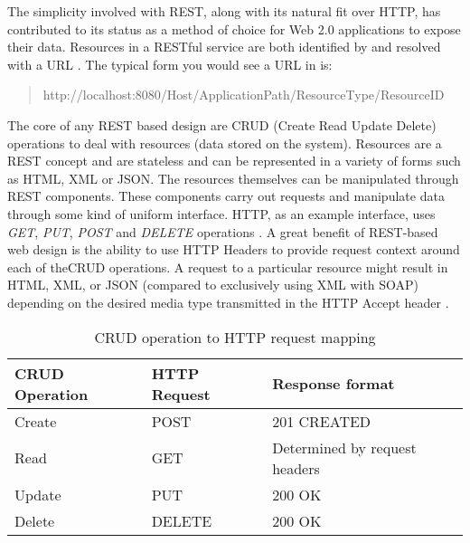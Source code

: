 The simplicity involved with REST, along with its natural fit over HTTP, has contributed to its status as a method of choice for Web 2.0 applications
to expose their data. 
Resources in a RESTful service are both identified by and resolved with a URL \cite{battle2008bridging}.
The typical form you would see a URL in is: 

\begin{quotation}
    http://localhost:8080/Host/ApplicationPath/ResourceType/ResourceID
\end{quotation}

The core of any REST based design are CRUD (Create Read Update Delete) operations to deal with resources (data stored on the system).
Resources are a REST concept and are stateless and can be represented in a variety of forms such as HTML, XML or JSON.
The resources themselves can be manipulated through REST components. These components carry out requests and manipulate data through some kind
of uniform interface. HTTP, as an example interface, uses \textit{GET}, \textit{PUT}, \textit{POST} and \textit{DELETE} operations \cite{cdimascio2013restdesign}.
A great benefit of REST-based web design is the ability to use HTTP Headers to provide request context around each of theCRUD operations.
A request to a particular resource might result in HTML, XML, or JSON (compared to exclusively using XML with SOAP) depending on the desired
media type transmitted in the HTTP Accept header \cite{battle2008bridging}.


\begin{table} [ht]
    \begin{center}
        \begin{tabular}{ |l|l|l| }
            \hline
            CRUD Operation & HTTP Request & Response format\\
            \hline
            Create & POST & 201 CREATED\\ 
            Read & GET & Determined by request headers\\  
            Update & PUT & 200 OK \\   
            Delete & DELETE & 200 OK \\
            \hline
        \end{tabular}
        \caption{CRUD operation to HTTP request mapping}
    \end{center}           
\end{table}

